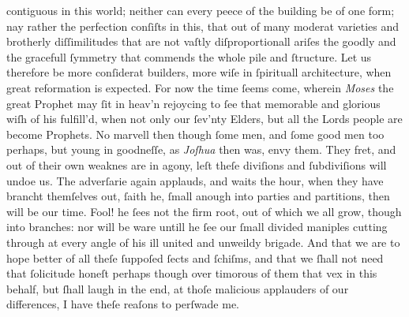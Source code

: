 contiguous in this world; neither can every peece of the building be of one
form; nay rather the perfection conſiſts in this, that out of many moderat
varieties and brotherly diſſimilitudes that are not vaſtly diſproportionall
ariſes the goodly and the gracefull ſymmetry that commends the whole pile and
ſtructure.  Let us therefore be more conſiderat builders, more wiſe in
ſpirituall architecture, when great reformation is expected.  For now the time
ſeems come, wherein \textit{Moses} the great Prophet may ſit in heav'n rejoycing
to ſee that memorable and glorious wiſh of his fulfill'd, when not only our
ſev'nty Elders, but all the Lords people are become Prophets.  No marvell then
though ſome men, and ſome good men too perhaps, but young in goodneſſe, as
\textit{Joſhua} then was, envy them.  They fret, and out of their own weaknes
are in agony, leſt theſe diviſions and ſubdiviſions will undoe us.  The
adverſarie again applauds, and waits the hour, when they have brancht themſelves
out, ſaith he, ſmall anough into parties and partitions, then will be our time.
Fool! he ſees not the firm root, out of which we all grow, though into branches:
nor will be ware untill he ſee our ſmall divided maniples cutting through at
every angle of his ill united and unweildy brigade.  And that we are to hope
better of all theſe ſuppoſed ſects and ſchiſms, and that we ſhall not need that
ſolicitude honeſt perhaps though over timorous of them that vex in this behalf,
but ſhall laugh in the end, at thoſe malicious applauders of our differences, I
have theſe reaſons to perſwade me.

